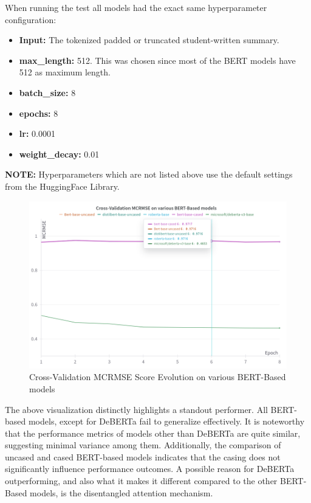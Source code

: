 \vspace{2em}

\noindent When running the test all models had the exact same hyperparameter configuration:%
\begin{itemize}
	\item \textbf{Input:} The tokenized padded or truncated student-written summary.
	\item \textbf{\gls{max_length}:} 512. This was chosen since most of the BERT models have 512 as maximum length.
	\item \textbf{\gls{batch_size}:} 8
    \item \textbf{\glspl{epoch}:} 8
    \item \textbf{\gls{lr}:} 0.0001
    \item \textbf{\gls{weight_decay}:} 0.01
\end{itemize}
\textbf{NOTE:} Hyperparameters which are not listed above use the default settings from the HuggingFace Library.

\begin{figure}[H]
\includegraphics[keepaspectratio, width=\textwidth]{img/cross-validation-performance.png}
\caption{Cross-Validation MCRMSE Score Evolution on various BERT-Based models}
\label{fig:cross-validation}
\end{figure}
\vspace{1em}

The above visualization distinctly highlights a standout performer. All BERT-based models, except for DeBERTa fail to generalize effectively.
It is noteworthy that the performance metrics of models other than DeBERTa are quite similar, suggesting minimal variance among them. Additionally, the comparison of uncased and cased BERT-based models indicates that the casing does not significantly influence performance outcomes.
A possible reason for DeBERTa outperforming, and also what it makes it different compared to the other BERT-Based models, is the disentangled attention mechanism.

